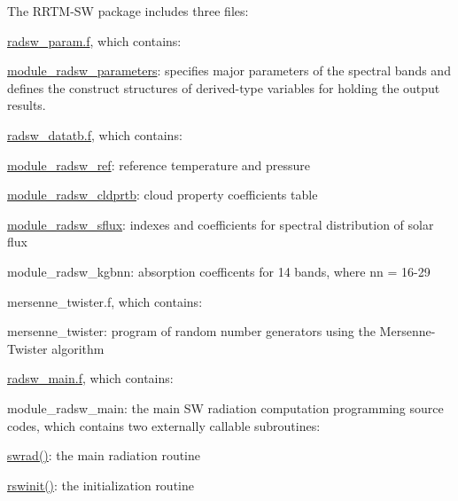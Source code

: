 The R\+R\+T\+M-\/\+SW package includes three files\+:
\begin{DoxyItemize}
\item \hyperlink{radsw__param_8f}{radsw\+\_\+param.\+f}, which contains\+:
\begin{DoxyItemize}
\item \hyperlink{namespacemodule__radsw__parameters}{module\+\_\+radsw\+\_\+parameters}\+: specifies major parameters of the spectral bands and defines the construct structures of derived-\/type variables for holding the output results.
\end{DoxyItemize}
\item \hyperlink{radsw__datatb_8f}{radsw\+\_\+datatb.\+f}, which contains\+:
\begin{DoxyItemize}
\item \hyperlink{namespacemodule__radsw__ref}{module\+\_\+radsw\+\_\+ref}\+: reference temperature and pressure
\item \hyperlink{namespacemodule__radsw__cldprtb}{module\+\_\+radsw\+\_\+cldprtb}\+: cloud property coefficients table
\item \hyperlink{namespacemodule__radsw__sflux}{module\+\_\+radsw\+\_\+sflux}\+: indexes and coefficients for spectral distribution of solar flux
\item module\+\_\+radsw\+\_\+kgbnn\+: absorption coefficents for 14 bands, where nn = 16-\/29
\end{DoxyItemize}
\item mersenne\+\_\+twister.\+f, which contains\+:
\begin{DoxyItemize}
\item mersenne\+\_\+twister\+: program of random number generators using the Mersenne-\/\+Twister algorithm
\end{DoxyItemize}
\item \hyperlink{radsw__main_8f}{radsw\+\_\+main.\+f}, which contains\+:
\begin{DoxyItemize}
\item module\+\_\+radsw\+\_\+main\+: the main SW radiation computation programming source codes, which contains two externally callable subroutines\+:
\begin{DoxyItemize}
\item \hyperlink{group__module__radsw__main_ga784397878835a8cdd0b14a7b9eafb4e3}{swrad()}\+: the main radiation routine
\item \hyperlink{group__module__radsw__main_ga5b0d35149515607d94f42b6ee5a40665}{rswinit()}\+: the initialization routine
\end{DoxyItemize}
\end{DoxyItemize}
\end{DoxyItemize}

